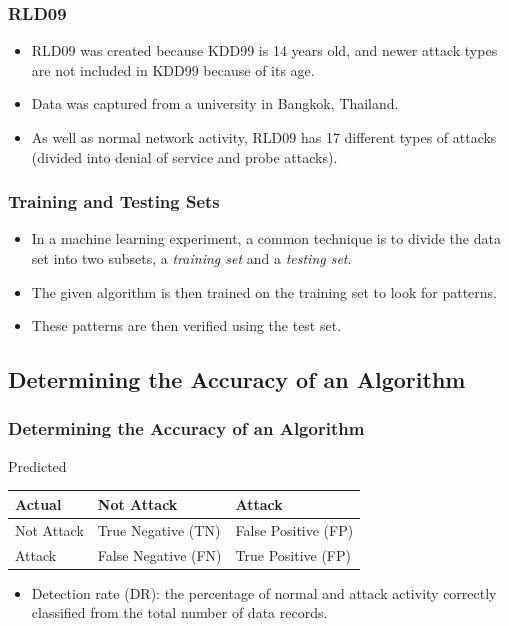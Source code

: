 \documentclass{beamer}
\newcommand{\linespace}{\vskip 0.25cm}
\begin{document}
\begin{frame}
  \frametitle{RLD09}
	\begin{itemize}
		\item RLD09 was created because KDD99 is 14 years old, and newer attack types are not included in KDD99 because of its age.
		\item Data was captured from a university in Bangkok, Thailand.
		\item As well as normal network activity, RLD09 has 17 different types of attacks (divided into denial of service and probe attacks).
	\end{itemize}
\end{frame}



\begin{frame}
  \frametitle{Training and Testing Sets}
	\begin{itemize}
		\item In a machine learning experiment, a common technique is to divide the data set into two subsets, a \emph{training set} and a \emph{testing set}.
        \item The given algorithm is then trained on the training set to look for patterns.
        \item These patterns are then verified using the test set.
	\end{itemize}
\end{frame}



\subsection{Determining the Accuracy of an Algorithm}
\begin{frame}
  \frametitle{Determining the Accuracy of an Algorithm}
\begin{table}
Predicted
\begin{tabular}{l|ll}
Actual   & Not Attack & Attack \\ \hline
Not Attack & True Negative (TN) & False Positive (FP) \\
Attack & False Negative (FN) & True Positive (FP)  \\
\end{tabular}
\end{table}
\linespace
	\begin{itemize}
		\item Detection rate (DR): the percentage of normal and attack activity correctly classified from the total number of data records.
	\end{itemize}
\end{frame}
\end{document}
